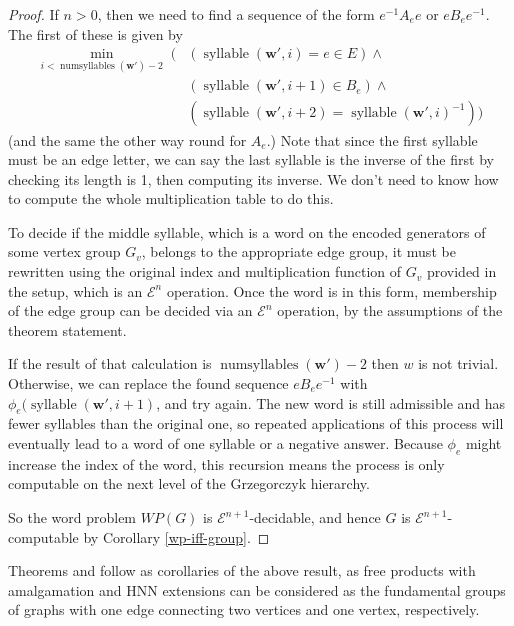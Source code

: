 \documentclass[a4paper]{article}
\newcommand{\grz}[1]{$\mathcal{E}^{#1}$}	%
\newcommand{\wvec}{\mathbf{w}}	%
\theoremstyle{plain}
\theoremstyle{definition}
\begin{document}
\begin{proof}
If $n>0$, then we need to find a sequence of the form $e^{-1}A_ee$ or $eB_ee^{-1}$. The first of these is given by
\begin{equation}
\begin{split}
	\min_{i < \operatorname{numsyllables}(\wvec')-2} \; (
		&  (\operatorname{syllable}(\wvec',i) = e \in E) \wedge \\ 
		& ( \operatorname{syllable}(\wvec',i+1) \in B_e ) \wedge \\ 
		& ( \operatorname{syllable}(\wvec',i+2) = \operatorname{syllable}(\wvec',i)^{-1} ) 
	)
\end{split} 
\end{equation}
(and the same the other way round for $A_e$.) Note that since the first syllable must be an edge letter, we can say the last syllable is the inverse of the first by checking its length is 1, then computing its inverse. We don't need to know how to compute the whole multiplication table to do this.

To decide if the middle syllable, which is a word on the encoded generators of some vertex group $G_v$, belongs to the appropriate edge group, it must be rewritten using the original index and multiplication function of $G_v$ provided in the setup, which is an \grz{n} operation. Once the word is in this form, membership of the edge group can be decided via an \grz{n} operation, by the assumptions of the theorem statement.

If the result of that calculation is $\operatorname{numsyllables}(\wvec')-2$ then $w$ is not trivial. Otherwise, we can replace the found sequence $eB_ee^{-1}$ with $\phi_e(\operatorname{syllable}(\wvec',i+1)$, and try again. The new word is still admissible and has fewer syllables than the original one, so repeated applications of this process will eventually lead to a word of one syllable or a negative answer. Because $\phi_e$ might increase the index of the word, this recursion means the process is only computable on the next level of the Grzegorczyk hierarchy.

So the word problem $WP(G)$ is \grz{n+1}-decidable, and hence $G$ is \grz{n+1}-computable by Corollary \ref{wp-iff-group}.
\end{proof}

Theorems \cite[4.6]{Cannonito_1973} and \cite[5.3]{Cannonito_1973} follow as corollaries of the above result, as free products with amalgamation and HNN extensions can be considered as the fundamental groups of graphs with one edge connecting two vertices and one vertex, respectively.
\end{document}
